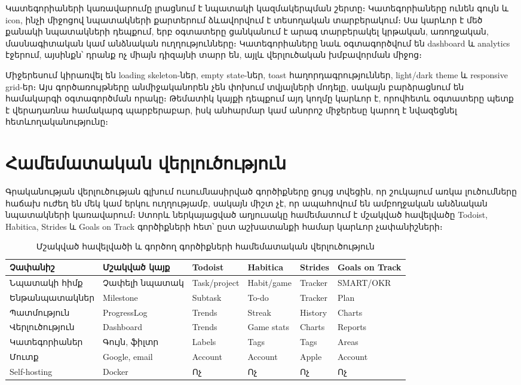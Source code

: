 Կատեգորիաների կառավարումը լրացնում է նպատակի կազմակերպման շերտը։ Կատեգորիաները ունեն գույն և icon, ինչի միջոցով նպատակների քարտերում ձևավորվում է տեսողական տարբերակում։ Սա կարևոր է մեծ քանակի նպատակների դեպքում, երբ օգտատերը ցանկանում է արագ տարբերակել կրթական, առողջական, մասնագիտական կամ անձնական ուղղությունները։ Կատեգորիաները նաև օգտագործվում են dashboard և analytics էջերում, այսինքն՝ դրանք ոչ միայն դիզայնի տարր են, այլև վերլուծական խմբավորման միջոց։

Միջերեսում կիրառվել են loading skeleton-ներ, empty state-ներ, toast հաղորդագրություններ, light/dark theme և responsive grid-եր։ Այս գործառույթները անմիջականորեն չեն փոխում տվյալների մոդելը, սակայն բարձրացնում են համակարգի օգտագործման որակը։ Թեմատիկ կայքի դեպքում այդ կողմը կարևոր է, որովհետև օգտատերը պետք է վերադառնա համակարգ պարբերաբար, իսկ անհարմար կամ անորոշ միջերեսը կարող է նվազեցնել հետևողականությունը։

\section{Համեմատական վերլուծություն}

Գրականության վերլուծության գլխում ուսումնասիրված գործիքները ցույց տվեցին, որ շուկայում առկա լուծումները հաճախ ուժեղ են մեկ կամ երկու ուղղությամբ, սակայն միշտ չէ, որ ապահովում են ամբողջական անձնական նպատակների կառավարում։ Ստորև ներկայացված աղյուսակը համեմատում է մշակված հավելվածը Todoist, Habitica, Strides և Goals on Track գործիքների հետ՝ ըստ աշխատանքի համար կարևոր չափանիշների։

\begin{table}[h]
\centering
\scriptsize
\begin{tabular}{p{2.8cm}p{2.1cm}p{1.9cm}p{1.9cm}p{1.9cm}p{2.1cm}}
\toprule
\textbf{Չափանիշ} & \textbf{Մշակված կայք} & \textbf{Todoist} & \textbf{Habitica} & \textbf{Strides} & \textbf{Goals on Track} \\
\midrule
Նպատակի հիմք & Չափելի նպատակ & Task/project & Habit/game & Tracker & SMART/OKR \\
Ենթանպատակներ & Milestone & Subtask & To-do & Tracker & Plan \\
Պատմություն & ProgressLog & Trends & Streak & History & Charts \\
Վերլուծություն & Dashboard & Trends & Game stats & Charts & Reports \\
Կատեգորիաներ & Գույն, ֆիլտր & Labels & Tags & Tags & Areas \\
Մուտք & Google, email & Account & Account & Apple & Account \\
Self-hosting & Docker & Ոչ & Ոչ & Ոչ & Ոչ \\
\bottomrule
\end{tabular}
\caption{Մշակված հավելվածի և գործող գործիքների համեմատական վերլուծություն}
\end{table}

